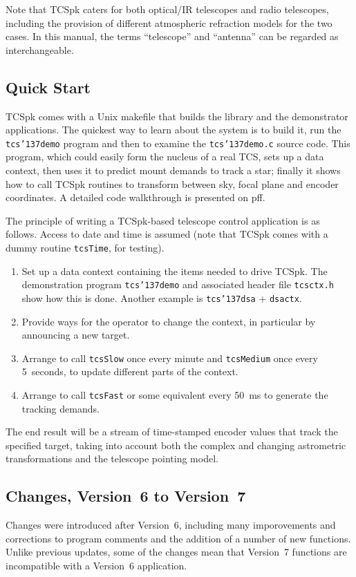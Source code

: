 \documentclass[12pt,fleqn,twoside]{article}
\renewcommand{\_}{{\tt\char'137}}     %
\begin{document}
Note that TCSpk caters for both optical/IR telescopes and radio
telescopes, including the provision of different atmospheric
refraction models for the two cases.  In this manual, the terms
``telescope'' and ``antenna'' can be regarded as interchangeable.

\subsection{Quick Start}

TCSpk comes with a Unix makefile that builds the library and the
demonstrator applications.  The quickest way to learn about the system
is to build it, run the {\tt tcs\_demo} program and then to examine the
{\tt tcs\_demo.c} source code.  This program, which could easily form
the nucleus of a real TCS, sets up a
data context, then uses it to predict mount demands to track a star;
finally it shows how to call TCSpk routines to transform between
sky, focal plane and encoder coordinates.  A detailed code walkthrough
is presented on p\pageref{tcs_demo}ff.

The principle of writing a TCSpk-based
telescope control application is as follows.
Access to date and time is assumed (note that TCSpk comes with a
dummy routine {\tt tcsTime}, for testing).
\begin{enumerate}
\item Set up a data context containing the items needed to drive
      TCSpk.  The demonstration program {\tt tcs\_demo} and
      associated header file {\tt tcsctx.h} show how this is done.
      Another example is {\tt tcs\_dsa} + {\tt dsactx}.
\item Provide ways for the operator to change the context, in
      particular by announcing a new target.
\item Arrange to call {\tt tcsSlow} once every minute and
      {\tt tcsMedium} once every 5~seconds, to update different
      parts of the context.
\item Arrange to call {\tt tcsFast} or some equivalent every
      50~ms to generate the tracking demands.
\end{enumerate}
The end result will be a stream of time-stamped encoder values
that track the specified target, taking into account both the
complex and changing astrometric transformations and the telescope
pointing model.

\ifx\vdoc\vfull
\subsection{Changes, Version~6 to Version~7}
Changes were introduced after Version~6, including many imporovements
and corrections to program comments and the addition of a number of
new functions.  Unlike previous updates, some of the changes mean that
Version~7 functions are incompatible with a
Version~6 application.
\end{document}

